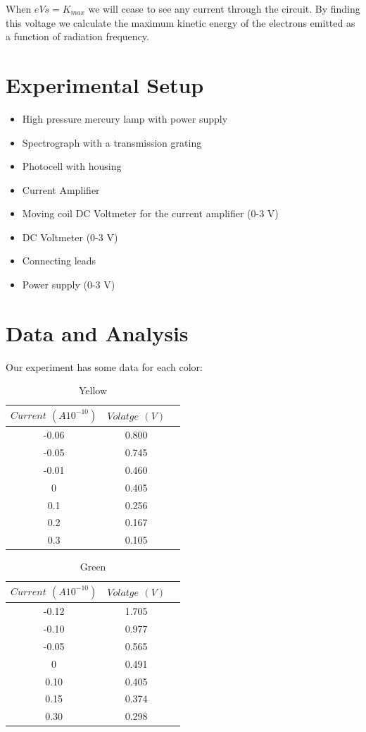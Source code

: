 \documentclass[aps,nofootinbib,onecolumn,groupedaddress,a4paper]{revtex4}
\begin{document}
When $e{V}{s} = {K}_{max}$ we will cease to see any current
through the circuit. By finding this voltage we calculate
the maximum kinetic energy of the electrons emitted as a
function of radiation frequency.


\section{Experimental Setup}
\begin{itemize}
\item High pressure mercury lamp with power supply
\item Spectrograph with a transmission grating
\item Photocell with housing
\item Current Amplifier
\item Moving coil DC Voltmeter for the current amplifier (0-3 V)
\item DC Voltmeter (0-3 V)
\item Connecting leads
\item Power supply (0-3 V)
\end{itemize}


\section{Data and Analysis}

Our experiment has some data for each color:\\


\begin{table}
\caption{Yellow \label{rawdata}}
\centering
\begin{tabular}{ccc}
\\
$Current$ $(A {10}^{-10})$ & $Volatge$ $(V)$ \\
\hline
-0.06 		&  0.800  	\\
-0.05    	&  0.745  	\\
-0.01 		&  0.460 	\\
0 			&  0.405  	\\
0.1 		&  0.256  	\\
0.2 		&  0.167   	\\
0.3 		&  0.105   
\end{tabular}
\label{default}
\end{table}

\begin{table}
\caption{Green \label{rawdata}}
\centering
\begin{tabular}{ccc}
\\
$Current$ $(A {10}^{-10})$ & $Volatge$ $(V)$ \\
\hline
-0.12 &  1.705   \\
-0.10 &  0.977  \\
-0.05 &  0.565  \\
0 & 0.491  \\
0.10 & 0.405  \\
0.15 & 0.374   \\
0.30 & 0.298   
\end{tabular}
\label{default}
\end{table}%
\end{document}
